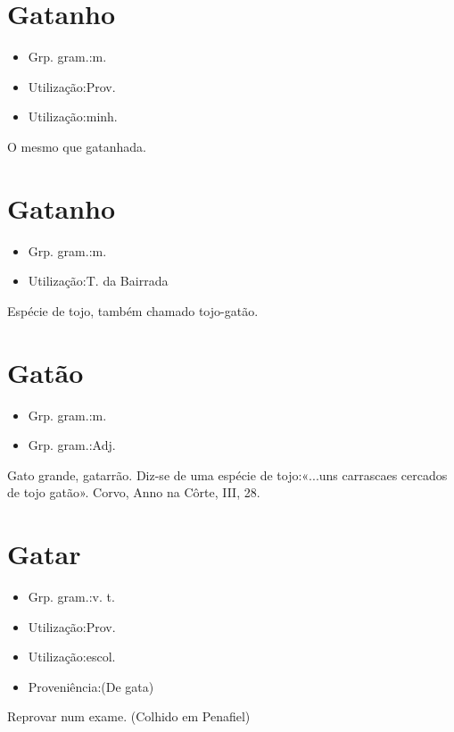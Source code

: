 \section{Gatanho}
\begin{itemize}
\item {Grp. gram.:m.}
\end{itemize}
\begin{itemize}
\item {Utilização:Prov.}
\end{itemize}
\begin{itemize}
\item {Utilização:minh.}
\end{itemize}
O mesmo que \textunderscore gatanhada\textunderscore .
\section{Gatanho}
\begin{itemize}
\item {Grp. gram.:m.}
\end{itemize}
\begin{itemize}
\item {Utilização:T. da Bairrada}
\end{itemize}
Espécie de tojo, também chamado tojo-gatão.
\section{Gatão}
\begin{itemize}
\item {Grp. gram.:m.}
\end{itemize}
\begin{itemize}
\item {Grp. gram.:Adj.}
\end{itemize}
Gato grande, gatarrão.
Diz-se de uma espécie de tojo:«\textunderscore ...uns carrascaes cercados de tojo gatão\textunderscore ». Corvo, \textunderscore Anno na Côrte\textunderscore , III, 28.
\section{Gatar}
\begin{itemize}
\item {Grp. gram.:v. t.}
\end{itemize}
\begin{itemize}
\item {Utilização:Prov.}
\end{itemize}
\begin{itemize}
\item {Utilização:escol.}
\end{itemize}
\begin{itemize}
\item {Proveniência:(De \textunderscore gata\textunderscore )}
\end{itemize}
Reprovar num exame. (Colhido em Penafiel)
